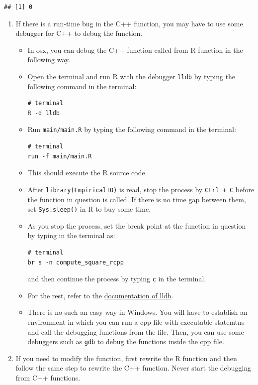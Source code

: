 \documentclass[]{book}
\providecommand{\tightlist}{%
  \setlength{\itemsep}{0pt}\setlength{\parskip}{0pt}}
\begin{document}
\begin{verbatim}
## [1] 0
\end{verbatim}

\begin{enumerate}
\def\labelenumi{\arabic{enumi}.}
\setcounter{enumi}{11}
\tightlist
\item
  If there is a run-time bug in the C++ function, you may have to use
  some debugger for C++ to debug the function.

  \begin{itemize}
  \item
    In osx, you can debug the C++ function called from R function in the
    following way.
  \item
    Open the terminal and run R with the debugger \texttt{lldb} by
    typing the following command in the terminal:

\begin{verbatim}
# terminal
R -d lldb
\end{verbatim}
  \item
    Run \texttt{main/main.R} by typing the following command in the
    terminal:

\begin{verbatim}
# terminal
run -f main/main.R
\end{verbatim}
  \item
    This should execute the R source code.
  \item
    After \texttt{library(EmpiricalIO)} is read, stop the process by
    \texttt{Ctrl\ +\ C} before the function in question is called. If
    there is no time gap between them, set \texttt{Sys.sleep()} in R to
    buy some time.
  \item
    As you stop the process, set the break point at the function in
    question by typing in the terminal as:

\begin{verbatim}
# terminal
br s -n compute_square_rcpp
\end{verbatim}

    and then continue the process by typing \texttt{c} in the terminal.
  \item
    For the rest, refer to the
    \href{https://lldb.llvm.org/}{documentation of lldb}.
  \item
    There is no such an easy way in Windows. You will have to establish
    an environment in which you can run a cpp file with executable
    statemtns and call the debugging functions from the file. Then, you
    can use some debuggers such as \texttt{gdb} to debug the functions
    inside the cpp file.
  \end{itemize}
\item
  If you need to modify the function, first rewrite the R function and
  then follow the same step to rewrite the C++ function. Never start the
  debugging from C++ functions.
\end{enumerate}
\end{document}
